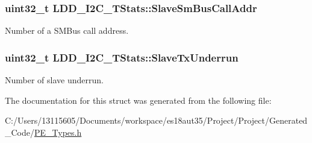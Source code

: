 \subsubsection[{Slave\+Sm\+Bus\+Call\+Addr}]{\setlength{\rightskip}{0pt plus 5cm}uint32\+\_\+t L\+D\+D\+\_\+\+I2\+C\+\_\+\+T\+Stats\+::\+Slave\+Sm\+Bus\+Call\+Addr}\label{struct_l_d_d___i2_c___t_stats_a134cb9fb9e37217e70e8a93924bca300}
Number of a S\+M\+Bus call address. \hypertarget{struct_l_d_d___i2_c___t_stats_add2f9914a1ea98c3bf86c0cab84e6a8c}{}
\subsubsection[{Slave\+Tx\+Underrun}]{\setlength{\rightskip}{0pt plus 5cm}uint32\+\_\+t L\+D\+D\+\_\+\+I2\+C\+\_\+\+T\+Stats\+::\+Slave\+Tx\+Underrun}\label{struct_l_d_d___i2_c___t_stats_add2f9914a1ea98c3bf86c0cab84e6a8c}
Number of slave underrun. 

The documentation for this struct was generated from the following file\+:\begin{DoxyCompactItemize}
\item 
C\+:/\+Users/13115605/\+Documents/workspace/es18aut35/\+Project/\+Project/\+Generated\+\_\+\+Code/\hyperlink{_p_e___types_8h}{P\+E\+\_\+\+Types.\+h}\end{DoxyCompactItemize}
